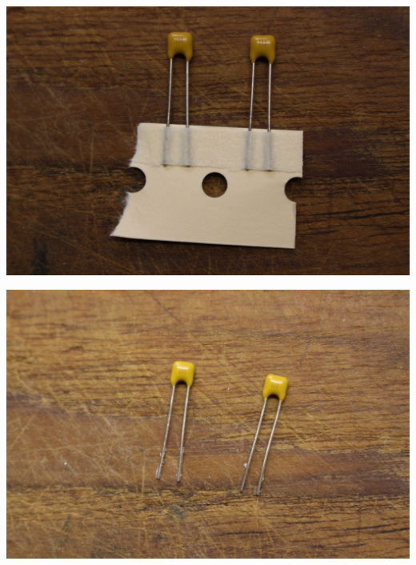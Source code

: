 \documentclass{article}
\begin{document}
\begin{minipage}[b]{0.5\textwidth}
	\includegraphics[width=\textwidth]{Bilder/IMG_5546.JPG}
	\label{fig:}
\end{minipage}
\begin{minipage}[b]{0.5\textwidth}
	\includegraphics[width=\textwidth]{Bilder/IMG_5547.JPG}
	\label{fig:}
\end{minipage}
\end{document}
